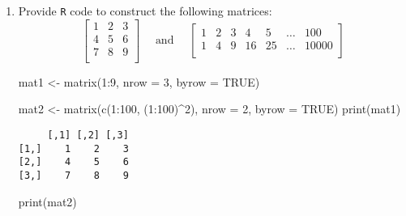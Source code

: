 \documentclass[
  letterpaper,
  DIV=11,
  numbers=noendperiod]{scrartcl}
\newenvironment{Shaded}{\begin{snugshade}}{\end{snugshade}}
\newcommand{\AttributeTok}[1]{\textcolor[rgb]{0.40,0.45,0.13}{#1}}
\newcommand{\ConstantTok}[1]{\textcolor[rgb]{0.56,0.35,0.01}{#1}}
\newcommand{\DecValTok}[1]{\textcolor[rgb]{0.68,0.00,0.00}{#1}}
\newcommand{\FunctionTok}[1]{\textcolor[rgb]{0.28,0.35,0.67}{#1}}
\newcommand{\NormalTok}[1]{\textcolor[rgb]{0.00,0.23,0.31}{#1}}
\newcommand{\OtherTok}[1]{\textcolor[rgb]{0.00,0.23,0.31}{#1}}
\newcommand{\SpecialCharTok}[1]{\textcolor[rgb]{0.37,0.37,0.37}{#1}}
\begin{document}
\begin{enumerate}
\def\labelenumi{\arabic{enumi}.}
\item
  Provide \texttt{R} code to construct the following matrices: \[
  \begin{bmatrix} 
  1 & 2 & 3\\
  4 & 5 & 6\\
  7 & 8 & 9\\
  \end{bmatrix}
  \quad \text{ and } \quad
  \begin{bmatrix} 
  1 & 2 & 3 & 4 & 5 & \dots & 100\\
  1 & 4 & 9 & 16 & 25 & \dots & 10000\\
  \end{bmatrix}
  \]

\begin{Shaded}
\begin{Highlighting}[]
\NormalTok{mat1 }\OtherTok{\textless{}{-}} \FunctionTok{matrix}\NormalTok{(}\DecValTok{1}\SpecialCharTok{:}\DecValTok{9}\NormalTok{, }\AttributeTok{nrow =} \DecValTok{3}\NormalTok{, }\AttributeTok{byrow =} \ConstantTok{TRUE}\NormalTok{)}

\NormalTok{mat2 }\OtherTok{\textless{}{-}} \FunctionTok{matrix}\NormalTok{(}\FunctionTok{c}\NormalTok{(}\DecValTok{1}\SpecialCharTok{:}\DecValTok{100}\NormalTok{, (}\DecValTok{1}\SpecialCharTok{:}\DecValTok{100}\NormalTok{)}\SpecialCharTok{\^{}}\DecValTok{2}\NormalTok{), }\AttributeTok{nrow =} \DecValTok{2}\NormalTok{, }\AttributeTok{byrow =} \ConstantTok{TRUE}\NormalTok{)}
\FunctionTok{print}\NormalTok{(mat1)}
\end{Highlighting}
\end{Shaded}

\begin{verbatim}
     [,1] [,2] [,3]
[1,]    1    2    3
[2,]    4    5    6
[3,]    7    8    9
\end{verbatim}

\begin{Shaded}
\begin{Highlighting}[]
\FunctionTok{print}\NormalTok{(mat2)}
\end{Highlighting}
\end{Shaded}


\end{enumerate}
\end{document}
